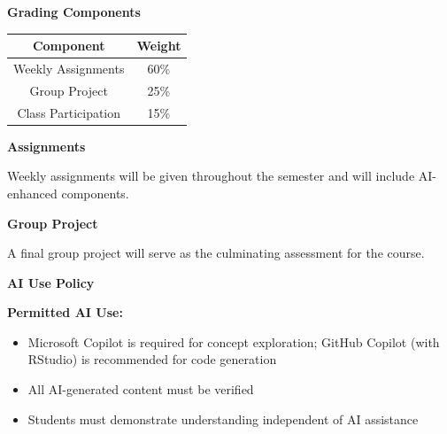\documentclass[11pt]{article}
\begin{document}
\vspace{8pt}

\noindent\textbf{Grading Components}

\begin{center}
\begin{tabular}{cc}
\toprule
Component & Weight \\
\midrule
Weekly Assignments & 60\% \\
Group Project & 25\% \\
Class Participation & 15\% \\
\bottomrule
\end{tabular}
\end{center}

\vspace{8pt}

\noindent\textbf{Assignments}

Weekly assignments will be given throughout the semester and will include \textcolor{aiblue}{AI-enhanced components}.

\vspace{8pt}

\noindent\textbf{Group Project}

A final group project will serve as the culminating assessment for the course.

\vspace{12pt}

\newpage

\noindent\textbf{AI Use Policy}

\begin{tcolorbox}[colback=aiblue!10,colframe=aiblue,boxrule=1pt,arc=2pt,left=6pt,right=6pt,top=6pt,bottom=6pt]
\textbf{Permitted AI Use:}
\begin{itemize}[leftmargin=10pt]
\item Microsoft Copilot is required for concept exploration; GitHub Copilot (with RStudio) is recommended for code generation
\item All AI-generated content must be verified
\item Students must demonstrate understanding independent of AI assistance
\end{itemize}


\end{tcolorbox}
\end{document}
